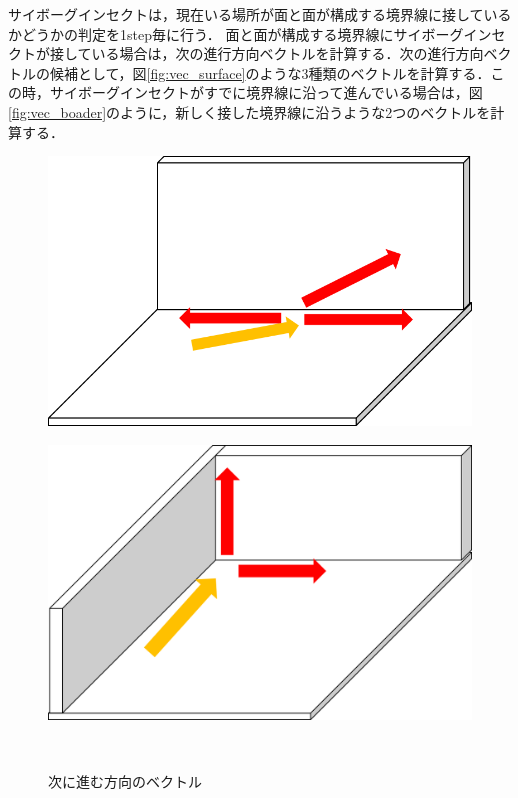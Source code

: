 \documentclass[a4paper,11pt]{jarticle}
\begin{document}
	サイボーグインセクトは，現在いる場所が面と面が構成する境界線に接しているかどうかの判定を1step毎に行う．
	面と面が構成する境界線にサイボーグインセクトが接している場合は，次の進行方向ベクトルを計算する．次の進行方向ベクトルの候補として，図\ref{fig:vec_surface}のような3種類のベクトルを計算する．この時，サイボーグインセクトがすでに境界線に沿って進んでいる場合は，図\ref{fig:vec_boader}のように，新しく接した境界線に沿うような2つのベクトルを計算する．
	\begin{figure}
		\begin{minipage}{0.5\linewidth}
			\centering
			\includegraphics[width=1\linewidth]{png/vector.png}
			\label{fig:vec_surface}
		\end{minipage}
		\begin{minipage}{0.5\linewidth}
			\centering
			\includegraphics[width=1\linewidth]{png/vector2.png}
			\label{fig:vec_boader}
		\end{minipage}\\
		\caption{次に進む方向のベクトル}
		\label{fig:vector}
	\end{figure}
\end{document}
